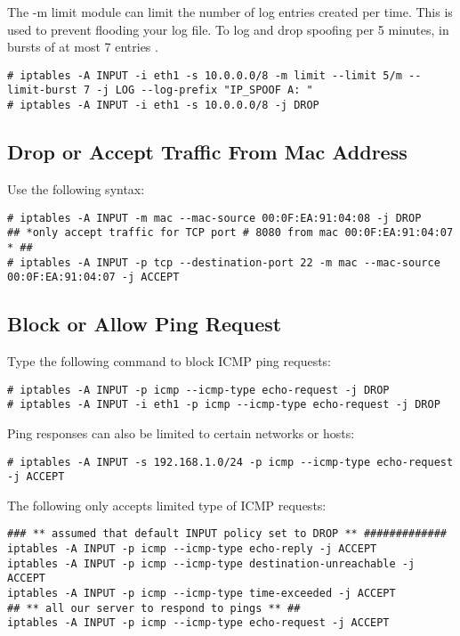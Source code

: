 The -m limit module can limit the number of log entries created per
time. This is used to prevent flooding your log file. To log and drop
spoofing per 5 minutes, in bursts of at most 7 entries .
\begin{verbatim}
# iptables -A INPUT -i eth1 -s 10.0.0.0/8 -m limit --limit 5/m --limit-burst 7 -j LOG --log-prefix "IP_SPOOF A: "
# iptables -A INPUT -i eth1 -s 10.0.0.0/8 -j DROP
\end{verbatim}

\subsection{Drop or Accept Traffic From Mac Address}

Use the following syntax:
\begin{verbatim}
# iptables -A INPUT -m mac --mac-source 00:0F:EA:91:04:08 -j DROP
## *only accept traffic for TCP port # 8080 from mac 00:0F:EA:91:04:07 * ##
# iptables -A INPUT -p tcp --destination-port 22 -m mac --mac-source 00:0F:EA:91:04:07 -j ACCEPT
\end{verbatim}

\subsection{Block or Allow Ping Request}

Type the following command to block ICMP ping requests:
\begin{verbatim}
# iptables -A INPUT -p icmp --icmp-type echo-request -j DROP
# iptables -A INPUT -i eth1 -p icmp --icmp-type echo-request -j DROP
\end{verbatim}

Ping responses can also be limited to certain networks or hosts:
\begin{verbatim}
# iptables -A INPUT -s 192.168.1.0/24 -p icmp --icmp-type echo-request -j ACCEPT
\end{verbatim}

The following only accepts limited type of ICMP requests:
\begin{verbatim}
### ** assumed that default INPUT policy set to DROP ** #############
iptables -A INPUT -p icmp --icmp-type echo-reply -j ACCEPT
iptables -A INPUT -p icmp --icmp-type destination-unreachable -j ACCEPT
iptables -A INPUT -p icmp --icmp-type time-exceeded -j ACCEPT
## ** all our server to respond to pings ** ##
iptables -A INPUT -p icmp --icmp-type echo-request -j ACCEPT
\end{verbatim}

